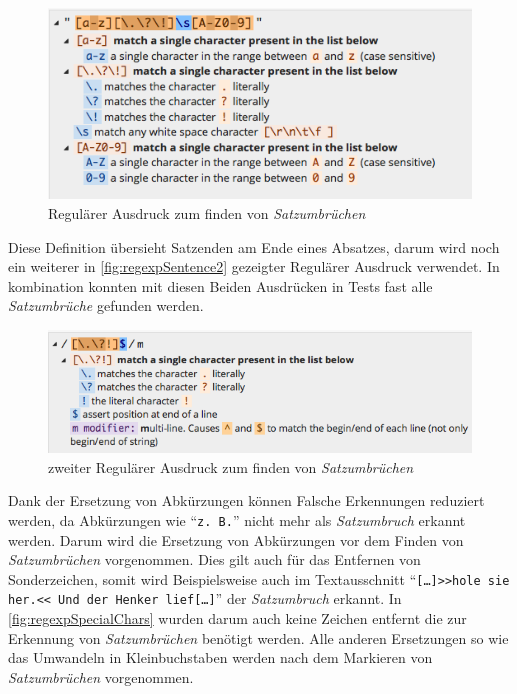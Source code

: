 		\begin{figure}[H]
        	\centering
            \includegraphics[width=0.8\linewidth]{images/regexpSentence.png}
  			\caption{Regulärer Ausdruck zum finden von \emph{Satzumbrüchen} \parencite{regex101:sentence1}}
			\label{fig:regexpSentence1}
		\end{figure}
        \newpage
            
		Diese Definition übersieht Satzenden am Ende eines Absatzes, darum wird noch ein weiterer in \autoref{fig:regexpSentence2} gezeigter Regulärer Ausdruck verwendet. In kombination konnten mit diesen Beiden Ausdrücken in Tests fast alle \emph{Satzumbrüche} gefunden werden.
            
        \begin{figure}[H]
			\centering
            \includegraphics[width=0.8\linewidth]{images/regexpSentence2.png}
  			\caption{zweiter Regulärer Ausdruck zum finden von \emph{Satzumbrüchen} \parencite{regex101:sentence2}}
			\label{fig:regexpSentence2}
		\end{figure}
            
        Dank der Ersetzung von Abkürzungen können Falsche Erkennungen reduziert werden, da Abkürzungen wie \enquote{\texttt{z. B.}} nicht mehr als \emph{Satzumbruch} erkannt werden. Darum wird die Ersetzung von Abkürzungen vor dem Finden von \emph{Satzumbrüchen} vorgenommen. Dies gilt auch für das Entfernen von Sonderzeichen, somit wird Beispielsweise auch im Textausschnitt \enquote{\texttt{[\dots]>>hole sie her.<< Und der Henker lief[\dots]}} der \emph{Satzumbruch} erkannt. In \autoref{fig:regexpSpecialChars} wurden darum auch keine Zeichen entfernt die zur Erkennung von \emph{Satzumbrüchen} benötigt werden. Alle anderen Ersetzungen so wie das Umwandeln in Kleinbuchstaben werden nach dem Markieren von \emph{Satzumbrüchen} vorgenommen.
